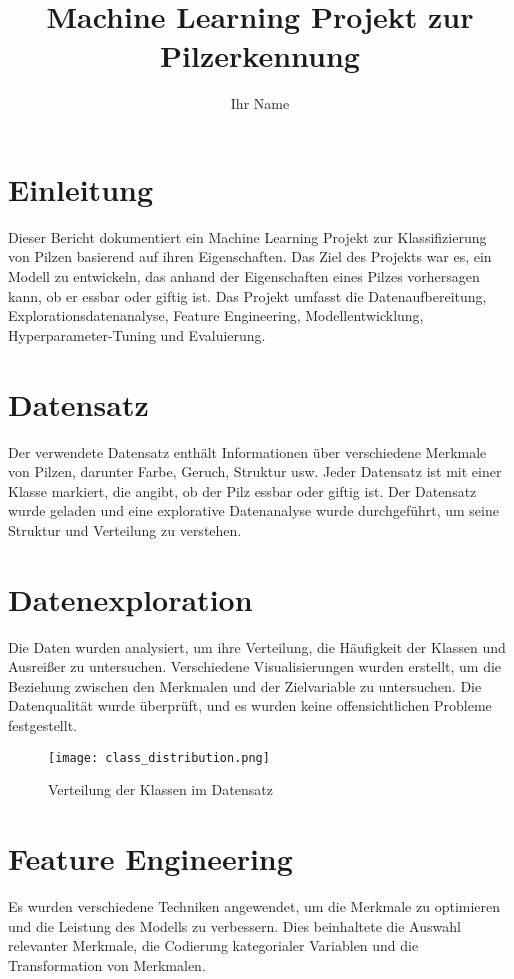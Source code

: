 \documentclass{article}
\title{Machine Learning Projekt zur Pilzerkennung}
\author{Ihr Name}
\begin{document}
\maketitle

\section{Einleitung}
Dieser Bericht dokumentiert ein Machine Learning Projekt zur Klassifizierung von Pilzen basierend auf ihren Eigenschaften. Das Ziel des Projekts war es, ein Modell zu entwickeln, das anhand der Eigenschaften eines Pilzes vorhersagen kann, ob er essbar oder giftig ist. Das Projekt umfasst die Datenaufbereitung, Explorationsdatenanalyse, Feature Engineering, Modellentwicklung, Hyperparameter-Tuning und Evaluierung.

\section{Datensatz}
Der verwendete Datensatz enthält Informationen über verschiedene Merkmale von Pilzen, darunter Farbe, Geruch, Struktur usw. Jeder Datensatz ist mit einer Klasse markiert, die angibt, ob der Pilz essbar oder giftig ist. Der Datensatz wurde geladen und eine explorative Datenanalyse wurde durchgeführt, um seine Struktur und Verteilung zu verstehen.

\section{Datenexploration}
Die Daten wurden analysiert, um ihre Verteilung, die Häufigkeit der Klassen und Ausreißer zu untersuchen. Verschiedene Visualisierungen wurden erstellt, um die Beziehung zwischen den Merkmalen und der Zielvariable zu untersuchen. Die Datenqualität wurde überprüft, und es wurden keine offensichtlichen Probleme festgestellt.

\begin{figure}[htbp]
    \centering
    \texttt{[image: class\_distribution.png]}
    \caption{Verteilung der Klassen im Datensatz}
\end{figure}

\section{Feature Engineering}
Es wurden verschiedene Techniken angewendet, um die Merkmale zu optimieren und die Leistung des Modells zu verbessern. Dies beinhaltete die Auswahl relevanter Merkmale, die Codierung kategorialer Variablen und die Transformation von Merkmalen.
\end{document}
